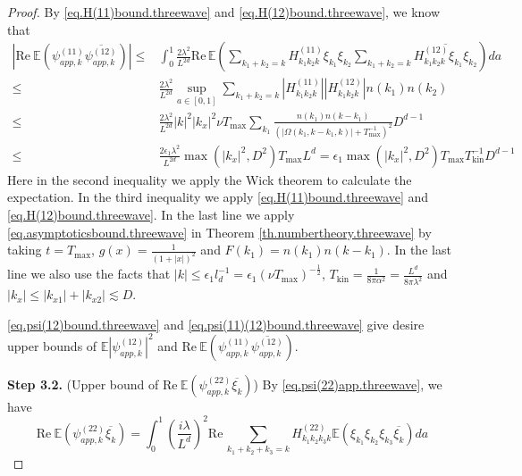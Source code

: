 \begin{proof}
By \eqref{eq.H(11)bound.threewave} and \eqref{eq.H(12)bound.threewave}, we know that 
\begin{equation}\label{eq.psi(11)(12)bound.threewave}
\begin{split}
    \left|\text{Re}\ \mathbb E \left(\psi^{(11)}_{app,k}\overline{\psi^{(12)}_{app,k}}\right)\right|
    \le& \int^1_{0}\frac{2\lambda^2}{L^{2d}} \text{Re}\,\mathbb E\left(\sum\limits_{k_1+k_2=k} H^{(11)}_{k_1k_2k}\xi_{k_1} \xi_{k_2}  \sum\limits_{k_1+k_2=k} \overline{H^{(12)}_{k_1k_2k}\xi_{k_1} \xi_{k_2}}\right) da 
    \\
    \le& \frac{2\lambda^2}{L^{2d}} \sup_{a\in[0,1]}\sum\limits_{k_1+k_2=k} \left|H^{(11)}_{k_1k_2k}\right|\left|H^{(12)}_{k_1k_2k}\right|n(k_1) n(k_2)
    \\
    \le& \frac{2\lambda^2}{L^{2d}} |k|^2|k_x|^2\nu T_{\text{max}} \sum\limits_{k_1} \frac{n(k_1) n(k-k_1)}{(|\Omega(k_1,k-k_1,k)|+T^{-1}_{\text{max}})^2}D^{d-1}
    \\
    \le& \frac{2\epsilon_1\lambda^2}{L^{2d}} \max(|k_x|^2,D^2) T_{\text{max}} L^d=\epsilon_1 \max(|k_x|^2,D^2) T_{\text{max}} T^{-1}_{\text{kin}} D^{d-1}
\end{split}   
\end{equation}
Here in the second inequality we apply the Wick theorem to calculate the expectation. In the third inequality we apply \eqref{eq.H(11)bound.threewave} and \eqref{eq.H(12)bound.threewave}. In the last line we apply \eqref{eq.asymptoticsbound.threewave} in Theorem \ref{th.numbertheory.threewave} by taking $t=T_{\text{max}}$, $g(x)=\frac{1}{(1+|x|)^2}$ and $F(k_1)=n(k_1) n(k-k_1)$. In the last line we also use the facts that $|k|\le \epsilon_1 l_{d}^{-1}=\epsilon_1 (\nu T_{\text{max}})^{-\frac{1}{2}}$, $T_{\text{kin}}=\frac{1}{8\pi\alpha^2}=\frac{L^{d}}{8\pi\lambda^2}$ and $|k_x|\le |k_{x1}|+|k_{x2}|\lesssim D$.

\eqref{eq.psi(12)bound.threewave} and \eqref{eq.psi(11)(12)bound.threewave} give desire upper bounds of $\mathbb E \left|\psi^{(12)}_{app,k}\right|^2$ and $\text{Re}\ \mathbb E \left(\psi^{(11)}_{app,k}\overline{\psi^{(12)}_{app,k}}\right)$.




\textbf{Step 3.2.} (Upper bound of $\text{Re}\  \mathbb E \left(\psi^{(22)}_{app,k}\overline{\xi_k}\right)$) By \eqref{eq.psi(22)app.threewave}, we have 
\begin{equation}
\text{Re}\  \mathbb E \left(\psi^{(22)}_{app,k}\overline{\xi_k}\right)=\int^1_{0}\left(\frac{i\lambda}{L^{d}}\right)^2 \text{Re}\,\sum\limits_{k_1+k_2+k_3=k} H^{(22)}_{k_1k_2k_3k}\mathbb E\left(\xi_{k_1} \xi_{k_2}\xi_{k_3}\overline{\xi_k}\right) da 
\end{equation}


\end{proof}
